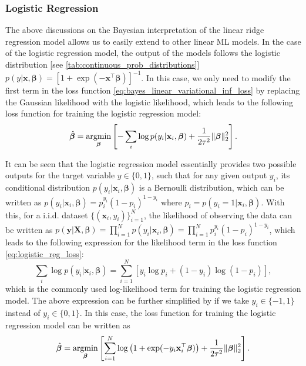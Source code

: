 \subsubsection{Logistic Regression}\label{appendix:logistic_regression}
The above discussions on the Bayesian interpretation of the linear ridge regression model allows us to easily extend to other linear ML models. In the case of the logistic regression model, the output of the models follows the logistic distribution [see \cref{tab:continuous_prob_distributions}] $p(y|\bm{x},\boldsymbol{\beta}) = [1+\exp(-\bm{x}^\top\boldsymbol{\beta})]^{-1}$. In this case, we only need to modify the first term in the loss function \cref{eq:bayes_linear_variational_inf_loss} by replacing the Gaussian likelihood with the logistic likelihood, which leads to the following loss function for training the logistic regression model:
\begin{equation}
    \label{eq:logistic_reg_loss}
    \hat{\boldsymbol{\beta}}=\operatorname*{argmin}_{\boldsymbol{\beta}} \left[-\sum_{i}\log p(y_i\vert \mathbf{x}_i,\boldsymbol{\beta})+\frac{1}{2\tau^2}\Vert\boldsymbol{\beta}\Vert_2^2\right].
\end{equation}

It can be seen that the logistic regression model essentially provides two possible outputs for the target variable $y\in\{0,1\}$, such that for any given output $y_i$, its conditional distribution $p(y_i|\bm{x}_i,\boldsymbol{\beta})$ is a Bernoulli distribution, which can be written as $p(y_i|\bm{x}_i,\boldsymbol{\beta}) = p_i^{y_i}(1-p_i)^{1-y_i}$ where $p_i=p(y_i=1|\bm{x}_i,\boldsymbol{\beta})$. 
With this, for a i.i.d. dataset $\{(\bm{x}_i,y_i)\}_{i=1}^{N}$, the likelihood of observing the data can be written as $p(\bm{y}|\bm{X},\boldsymbol{\beta}) = \prod_{i=1}^{N} p(y_i|\bm{x}_i,\boldsymbol{\beta}) = \prod_{i=1}^{N} p_i^{y_i}(1-p_i)^{1-y_i}$, which leads to the following expression for the likelihood term in the loss function \cref{eq:logistic_reg_loss}:
\begin{equation}    \label{eq:logistic_reg_loss_likelihood}
    \sum_{i}\log p(y_i\vert \bm{x}_i,\boldsymbol{\beta}) = \sum_{i=1}^{N} \left[y_i\log p_i + (1-y_i)\log (1-p_i)\right],
\end{equation}
which is the commonly used log-likelihood term for training the logistic regression model. The above expression can be further simplified by if we take $y_i\in\{-1,1\}$ instead of $y_i\in\{0,1\}$. In this case, the loss function for training the logistic regression model can be written as 
\begin{equation}    \label{eq:logistic_reg_loss_simplified}
    \hat{\boldsymbol{\beta}}=\operatorname*{argmin}_{\boldsymbol{\beta}} \left[\sum_{i=1}^{N} \log\left(1+\exp(-y_i\mathbf{x}_i^\top\boldsymbol{\beta})\right)+\frac{1}{2\tau^2}\Vert\boldsymbol{\beta}\Vert_2^2\right].
\end{equation}

